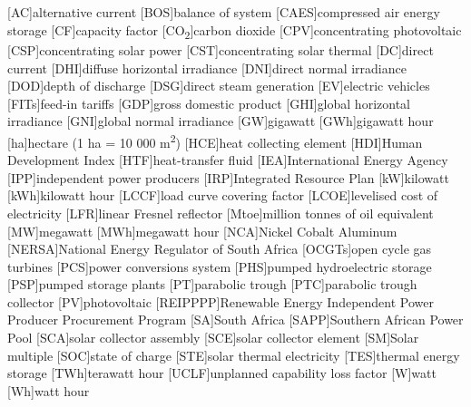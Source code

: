 {}
\chapter*{\listacroname}
\begin{acronym}[XXXXX]
  	[AC]{alternative current}
  	[BOS]{balance of system}
  	[CAES]{compressed air energy storage}
  	[CF]{capacity factor}
  	[CO\textsubscript{2}]{carbon dioxide}
    [CPV]{concentrating photovoltaic}
    [CSP]{concentrating solar power}
    [CST]{concentrating solar thermal} 
    [DC]{direct current}
    [DHI]{diffuse horizontal irradiance}
    [DNI]{direct normal irradiance}
	[DOD]{depth of discharge}
    [DSG]{direct steam generation}
    [EV]{electric vehicles}
    [FITs]{feed-in tariffs} 
    [GDP]{gross domestic product}
    [GHI]{global horizontal irradiance}
    [GNI]{global normal irradiance}
    [GW]{gigawatt}
    [GWh]{gigawatt hour} 
    [ha]{hectare (1 ha = 10 000 m\textsuperscript{2})} 
    [HCE]{heat collecting element}
    [HDI]{Human Development Index}
    [HTF]{heat-transfer fluid} 
    [IEA]{International Energy Agency}
    [IPP]{independent power producers}
    [IRP]{Integrated Resource Plan}
    [kW]{kilowatt}
    [kWh]{kilowatt hour}
    [LCCF]{load curve covering factor}
    [LCOE]{levelised cost of electricity}
    [LFR]{linear Fresnel reflector}
    [Mtoe]{million tonnes of oil equivalent}
    [MW]{megawatt}
    [MWh]{megawatt hour}
    [NCA]{Nickel Cobalt Aluminum}
    [NERSA]{National Energy Regulator of South Africa}
    [OCGTs]{open cycle gas turbines}
    [PCS]{power conversions system}
    [PHS]{pumped hydroelectric storage}
    [PSP]{pumped storage plants}
    [PT]{parabolic trough}
    [PTC]{parabolic trough collector}
    [PV]{photovoltaic}
    [REIPPPP]{Renewable Energy Independent Power Producer Procurement Program}
    [SA]{South Africa}
    [SAPP]{Southern African Power Pool}
    [SCA]{solar collector assembly}
    [SCE]{solar collector element}
    [SM]{Solar multiple}
    [SOC]{state of charge}
    [STE]{solar thermal electricity}
    [TES]{thermal energy storage}
    [TWh]{terawatt hour}
    [UCLF]{unplanned capability loss factor}
    [W]{watt}
    [Wh]{watt hour}
\end{acronym}
